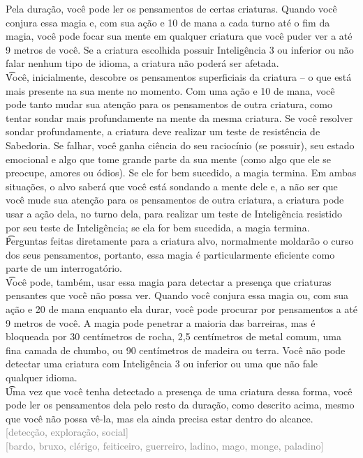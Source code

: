 \documentclass{RPG_Adventure}[2021/10/20]
\begin{document}
{\normalsize Pela duração, você pode ler os pensamentos de certas criaturas. Quando você conjura essa magia e, com sua ação e 10 de mana a cada turno até o fim da magia, você pode focar sua mente em qualquer criatura que você puder ver a até 9 metros de você. Se a criatura escolhida possuir Inteligência 3 ou inferior ou não falar nenhum tipo de idioma, a criatura não poderá ser afetada.\\\t Você, inicialmente, descobre os pensamentos superficiais da criatura – o que está mais presente na sua mente no momento. Com uma ação e 10 de mana, você pode tanto mudar sua atenção para os pensamentos de outra criatura, como tentar sondar mais profundamente na mente da mesma criatura. Se você resolver sondar profundamente, a criatura deve realizar um teste de resistência de Sabedoria. Se falhar, você ganha ciência do seu raciocínio (se possuir), seu estado emocional e algo que tome grande parte da sua mente (como algo que ele se preocupe, amores ou ódios). Se ele for bem sucedido, a magia termina. Em ambas situações, o alvo saberá que você está sondando a mente dele e, a não ser que você mude sua atenção para os pensamentos de outra criatura, a criatura pode usar a ação dela, no turno dela, para realizar um teste de Inteligência resistido por seu teste de Inteligência; se ela for bem sucedida, a magia termina.\\\t Perguntas feitas diretamente para a criatura alvo, normalmente moldarão o curso dos seus pensamentos, portanto, essa magia é particularmente eficiente como parte de um interrogatório.\\\t Você pode, também, usar essa magia para detectar a presença que criaturas pensantes que você não possa ver.  Quando você conjura essa magia ou, com sua ação e 20 de mana enquanto ela durar, você pode procurar por pensamentos a até 9 metros de você. A magia pode penetrar a maioria das barreiras, mas é bloqueada por 30 centímetros de rocha, 2,5 centímetros de metal comum, uma fina camada de chumbo, ou 90 centímetros de madeira ou terra. Você não pode detectar uma criatura com Inteligência 3 ou inferior ou uma que não fale qualquer idioma.\\\t Uma vez que você tenha detectado a presença de uma criatura dessa forma, você pode ler os pensamentos dela pelo resto da duração, como descrito acima, mesmo que você não possa vê-la, mas ela ainda precisa estar dentro do alcance.\\}
{\scriptsize \textcolor{gray}{[detecção, exploração, social]\\}}
{\scriptsize \textcolor{gray}{[bardo, bruxo, clérigo, feiticeiro, guerreiro, ladino, mago, monge, paladino]\\}}
\end{document}
